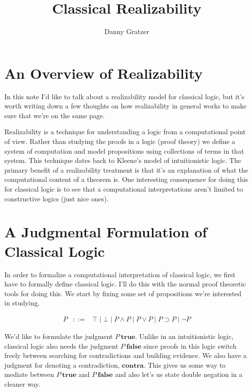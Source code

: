 \documentclass{amsart}
\title{Classical Realizability}
\author{Danny Gratzer}
\newcommand{\true}[1]{\ensuremath{#1\ \mathbf{true}}}
\newcommand{\false}[1]{\ensuremath{#1\ \mathbf{false}}}
\newcommand{\contra}{\ensuremath{\mathbf{contra}}}
\begin{document}
\maketitle

\section{An Overview of Realizability}


In this note I'd like to talk about a realizability model for
classical logic, but it's worth writing down a few thoughts on how
realizability in general works to make sure that we're on the same
page.

Realizability is a technique for understanding a logic from a
computational point of view. Rather than studying the proofs in a
logic (proof theory) we define a system of computation and model
propositions using collections of terms in that system. This technique
dates back to Kleene's model of intuitionistic logic. The primary
benefit of a realizability treatment is that it's an explanation of
what the computational content of a theorem is. One interesting
consequence for doing this for classical logic is to see that a
computational interpretations aren't limited to constructive logics
(just nice ones).

\section{A Judgmental Formulation of Classical Logic}

In order to formalize a computational interpretation of classical
logic, we first have to formally define classical logic. I'll do this
with the normal proof theoretic tools for doing this. We start by
fixing some set of propositions we're interested in studying.

\[
  \begin{array}{lcl}
    P & ::= & \top \mid \bot \mid P \wedge P \mid P \vee P \mid P
              \supset P \mid \neg P
  \end{array}
\]

We'd like to formulate the judgment \true{P}. Unlike in an
intuitionistic logic, classical logic also needs the judgment
\false{P} since proofs in this logic switch freely between searching
for contradictions and building evidence. We also have a judgment for
denoting a contradiction, \contra. This gives us some way to mediate
between \true{P} and \false{P} and also let's us state double
negation in a cleaner way.
\end{document}
